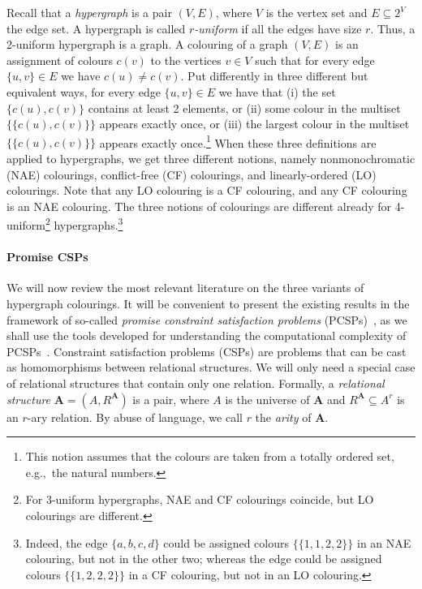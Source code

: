 \documentclass[a4paper,11pt]{article}
\newcommand{\2}{\vec{2}}
\newcommand{\1}{\vec{1}}
\newcommand{\0}{\vec{0}}
\renewcommand{\A}{\ensuremath{\mathbf{A}}}
\theoremstyle{plain}
\theoremstyle{definition}
\begin{document}
\medskip
Recall that a \emph{hypergraph} is a pair $(V, E)$, where $V$ is the vertex set and $E \subseteq 2^V$ the edge set. A hypergraph is called \emph{$r$-uniform} if all the edges have size $r$. Thus, a 2-uniform hypergraph is a graph.
A  colouring of a graph $(V,E)$ is an assignment of colours $c(v)$ to the vertices $v \in V$ such that for every edge $\{u,v\} \in E$ we have $c(u) \neq c(v)$. 
Put differently in three different but equivalent ways, for every edge $\{u,v\}\in E$ we have that
(i) the set $ \{ c(u), c(v) \}$ contains at least 2 elements,
or (ii) some colour in the multiset $\{\{ c(u), c(v) \}\}$ appears exactly once,
or (iii) the largest colour in the multiset $\{\{ c(u), c(v) \}\}$ appears exactly once.\footnote{This notion assumes that the colours are taken from a totally ordered set, e.g.,~the natural numbers.}
When these three definitions are applied to hypergraphs, we get three different notions, namely nonmonochromatic (NAE) colourings, conflict-free (CF) colourings, and linearly-ordered (LO) colourings.
Note that any LO colouring is a CF colouring, and any CF colouring is an NAE colouring. 
The three notions of colourings are different already for 4-uniform\footnote{For 3-uniform hypergraphs, NAE and CF colourings coincide, but LO colourings are different.} 
hypergraphs.\footnote{Indeed, the edge $\{a, b, c, d\}$ could be assigned colours $\{\{1, 1, 2, 2\}\}$ in an NAE colouring, but not in the other two; whereas the edge could be assigned colours $\{\{1, 2, 2, 2\}\}$ in a CF colouring, but not in an LO colouring.}



\paragraph{Promise CSPs}
We will now review the most relevant literature on the three variants of hypergraph colourings.
It will be convenient to present the existing results in the framework of so-called \emph{promise constraint satisfaction problems} (PCSPs)~\cite{BG21:sicomp}, as we shall use the tools developed for understanding the computational complexity of PCSPs~\cite{BBKO21}.
Constraint satisfaction problems (CSPs) are problems that can be cast as homomorphisms between relational structures. We will only need a special case of relational structures that contain only one relation. Formally, a \emph{relational structure} $\A=(A,{R^{\A}})$ is a pair, where $A$ is the universe of $\A$ and $R^\A\subseteq A^r$ is an $r$-ary relation. By abuse of language, we call $r$ the \emph{arity} of $\A$.
\end{document}
